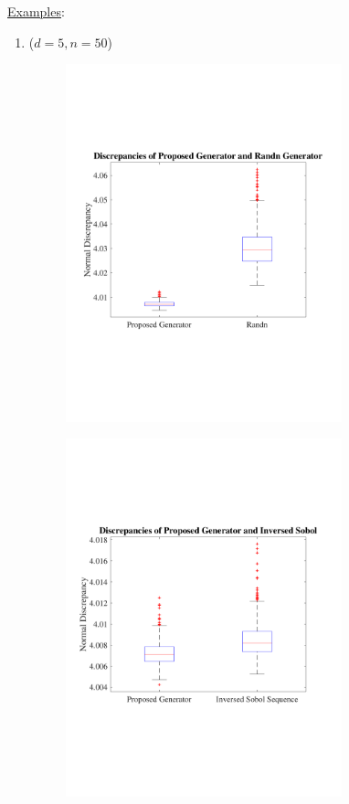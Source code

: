 \documentclass[12pt]{article}
\begin{document}
\underline{Examples}:
\begin{enumerate}
    \item 
    ($d=5, n=50$)
\begin{figure}[H]
\centering
{\includegraphics[width=8cm]{d5n50.pdf}}
\end{figure}
\begin{figure}[H]
\centering
{\includegraphics[width=8cm]{d5n50_invsobol.pdf}}
\end{figure}

    
\end{enumerate}
\end{document}
